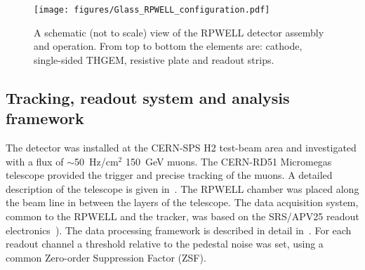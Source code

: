 \begin{figure}[h]
\centering
\texttt{[image: figures/Glass\_RPWELL\_configuration.pdf]}
\caption{A schematic (not to scale) view of the RPWELL detector assembly and operation. From top to bottom the elements are: cathode, single-sided THGEM, resistive plate and readout strips.}\label{fig: RPWELL scheme}
\end{figure}


\subsection{Tracking, readout system and analysis framework}
\label{sec: tracking and readout}

The detector was installed at the CERN-SPS H2 test-beam area and investigated with a flux of $\sim$50~Hz/cm$^2$ 150~GeV muons. The CERN-RD51 Micromegas telescope provided the trigger and precise tracking of the muons. A detailed description of the telescope is given in~\cite{karakostas2010micromegas,karakostas2012telescope}. The RPWELL chamber was placed along the beam line in between the layers of the telescope. The data acquisition system, common to the RPWELL and the tracker, was based on the SRS/APV25 readout electronics~\cite{martoiu2013development,french2001design}). The data processing framework is described in detail in~\cite{bressler2016first}. For each readout channel a threshold relative to the pedestal noise was set, using a common Zero-order Suppression Factor (ZSF).  

